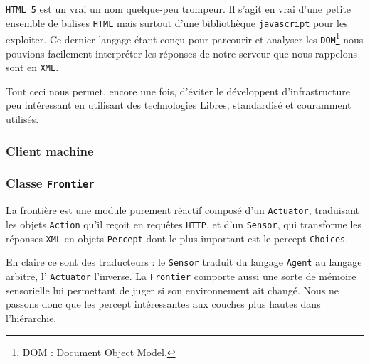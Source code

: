 \og \texttt{HTML 5} \fg{} est un vrai un nom quelque-peu trompeur. Il s'agit en vrai d'une petite ensemble de balises \texttt{HTML} mais surtout d'une bibliothèque \texttt{javascript} pour les exploiter. Ce dernier langage étant conçu pour parcourir et analyser les \texttt{DOM}\footnote{DOM : Document Object Model. } nous pouvions facilement interpréter les réponses de notre serveur que nous rappelons sont en \texttt{XML}.

Tout ceci nous permet, encore une fois, d'éviter le développent d'infrastructure peu intéressant en utilisant des technologies Libres, standardisé et couramment utilisés.   

\subsubsection{Client machine}

\subsubsection{Classe \texttt{Frontier}}
La frontière est une module purement réactif composé d'un \texttt{Actuator}, traduisant les objets \texttt{Action} qu'il reçoit en requêtes \texttt{HTTP}, et d'un \texttt{Sensor}, qui transforme les réponses \texttt{XML} en objets \texttt{Percept} dont le plus important est le percept \texttt{Choices}.

En claire ce sont des traducteurs : le \texttt{Sensor} traduit du langage \texttt{Agent} au langage arbitre, l' \texttt{Actuator} l'inverse. La \texttt{Frontier} comporte aussi une sorte de mémoire sensorielle lui permettant de juger si son environnement ait changé. Nous ne passons donc que les percept intéressantes aux couches plus hautes dans l'hiérarchie.  

